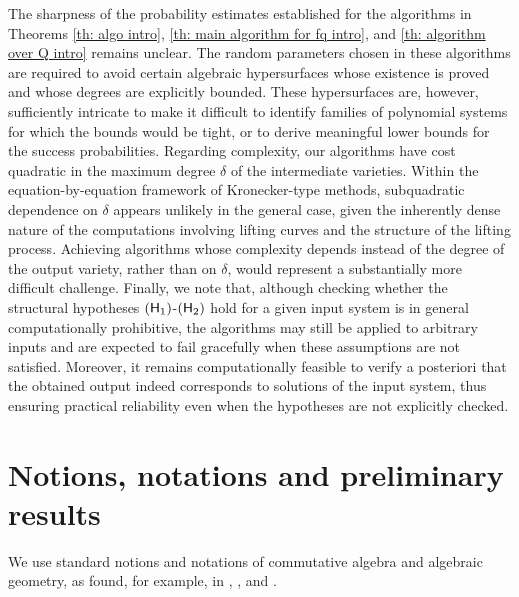 \documentclass[pdflatex,sn-basic]{sn-jnl}%
\theoremstyle{thmstyleone}%
\theoremstyle{thmstyletwo}%
\theoremstyle{thmstylethree}%
\theoremstyle{definition}
\numberwithin{equation}{section}
\begin{document}
The sharpness of the probability estimates established for the
algorithms in Theorems \ref{th: algo intro}, \ref{th: main algorithm
for fq intro}, and \ref{th: algorithm over Q intro} remains unclear.
The random parameters chosen in these algorithms are required to
avoid certain algebraic hypersurfaces whose existence is proved and
whose degrees are explicitly bounded. These hypersurfaces are,
however, sufficiently intricate to make it difficult to identify
families of polynomial systems for which the bounds would be tight,
or to derive meaningful lower bounds for the success probabilities.
Regarding complexity, our algorithms have cost quadratic in the
maximum degree $\delta$ of the intermediate varieties. Within the
equation-by-equation framework of Kronecker-type methods,
subquadratic dependence on $\delta$ appears unlikely in the general
case, given the inherently dense nature of the computations
involving lifting curves and the structure of the lifting process.
Achieving algorithms whose complexity depends instead of the degree
of the output variety, rather than on $\delta$, would represent a
substantially more difficult challenge. Finally, we note that,
although checking whether the structural hypotheses $({\sf
H}_1)$-$({\sf H}_2)$ hold for a given input system is in general
computationally prohibitive, the algorithms may still be applied to
arbitrary inputs and are expected to fail gracefully when these
assumptions are not satisfied. Moreover, it remains computationally
feasible to verify a posteriori that the obtained output indeed
corresponds to solutions of the input system, thus ensuring
practical reliability even when the hypotheses are not explicitly
checked.
%
%
%
\section{Notions, notations and preliminary results}
\label{section: notation, notations}
%
We use standard notions and notations of commutative algebra and
algebraic geometry, as found, for example, in \cite{Harris92},
\cite{Kunz85}, and \cite{Shafarevich94}.
\end{document}
